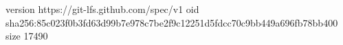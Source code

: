 version https://git-lfs.github.com/spec/v1
oid sha256:85c023f0b3fd63d99b7e978c7be2f9c12251d5fdcc70c9bb449a696fb78bb400
size 17490
